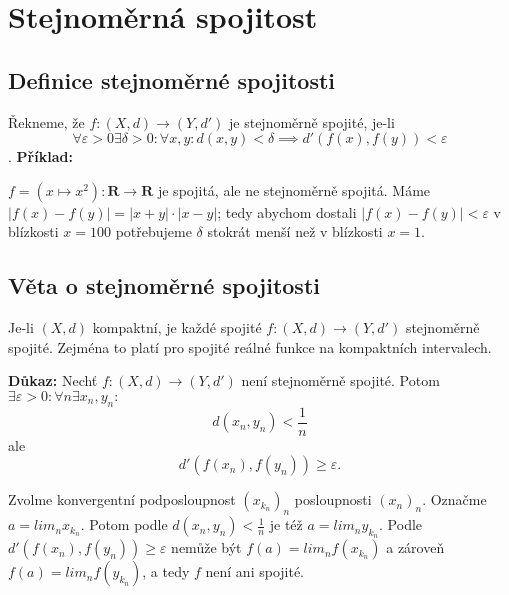 \documentclass[../main.tex]{subfiles}
\begin{document}
\section{Stejnoměrná spojitost}
\subsection{Definice stejnoměrné spojitosti}
\hspace{1.2mm}

Řekneme, že $f : (X,d) \rightarrow (Y,d')$ je stejnoměrně spojité, je-li
\[\forall \varepsilon > 0 \exists \delta > 0 : \forall x,y : d(x,y) < \delta \implies d'(f(x),f(y)) < \varepsilon\].
\noindent
\textbf{Příklad:}

$f = (x \mapsto x^2) : \mathbf{R} \rightarrow \mathbf{R}$ je spojitá, ale ne stejnoměrně spojitá.
Máme $|f(x) - f(y)| = |x+y| \cdot |x-y|$; tedy abychom dostali $|f(x)-f(y)| < \varepsilon $ v 
blízkosti $x = 100$ potřebujeme $\delta$ stokrát menší než v blízkosti $x = 1$.

\subsection{Věta o stejnoměrné spojitosti}
\hspace{1.2mm}
Je-li $(X,d)$ kompaktní, je každé spojité $f : (X,d) \rightarrow (Y,d')$ stejnoměrně spojité. Zejména to platí 
pro spojité reálné funkce na kompaktních intervalech.


\vspace{5mm}
\noindent
\textbf{Důkaz:} Nechť $f : (X,d) \rightarrow (Y,d')$ není stejnoměrně spojité. Potom $\exists \varepsilon > 0 : \forall n \exists x_n, y_n :$
\[d(x_n,y_n) < \frac{1}{n}\]
ale
\[d'(f(x_n),f(y_n)) \geq \varepsilon.\]

Zvolme konvergentní podposloupnost $(x_{k_n})_n$ posloupnosti $(x_n)_n$. Označme $a = lim_n x_{k_n}.$ Potom podle $d(x_n,y_n) < \frac{1}{n}$ je též 
$a = lim_n y_{k_n}.$ Podle $d'(f(x_n),f(y_n)) \geq \varepsilon$ nemůže být $f(a) = lim_n f(x_{k_n})$ a zároveň $f(a) = lim_n f(y_{k_n})$, 
a tedy $f$ není ani spojité.
\end{document}
